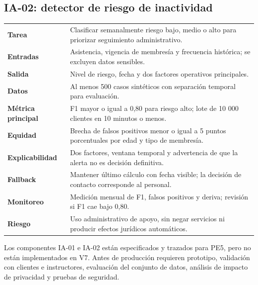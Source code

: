 \subsection{IA-02: detector de riesgo de inactividad}
\begin{tabularx}{\textwidth}{>{\bfseries}p{3.8cm}Y}
Tarea & Clasificar semanalmente riesgo bajo, medio o alto para priorizar seguimiento administrativo.\\
Entradas & Asistencia, vigencia de membresía y frecuencia histórica; se excluyen datos sensibles.\\
Salida & Nivel de riesgo, fecha y dos factores operativos principales.\\
Datos & Al menos 500 casos sintéticos con separación temporal para evaluación.\\
Métrica principal & F1 mayor o igual a 0,80 para riesgo alto; lote de 10 000 clientes en 10 minutos o menos.\\
Equidad & Brecha de falsos positivos menor o igual a 5 puntos porcentuales por edad y tipo de membresía.\\
Explicabilidad & Dos factores, ventana temporal y advertencia de que la alerta no es decisión definitiva.\\
Fallback & Mantener último cálculo con fecha visible; la decisión de contacto corresponde al personal.\\
Monitoreo & Medición mensual de F1, falsos positivos y deriva; revisión si F1 cae bajo 0,80.\\
Riesgo & Uso administrativo de apoyo, sin negar servicios ni producir efectos jurídicos automáticos.\\
\end{tabularx}

\begin{alertbox}
Los componentes IA-01 e IA-02 están especificados y trazados para PE5, pero no están implementados en V7. Antes de producción requieren prototipo, validación con clientes e instructores, evaluación del conjunto de datos, análisis de impacto de privacidad y pruebas de seguridad.
\end{alertbox}
